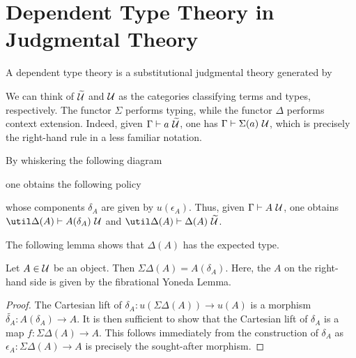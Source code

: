 \documentclass{amsart}
\begin{document}
\section{Dependent Type Theory in Judgmental Theory}
\label{sec:dependent-type-theory-in-judgmental-theory}

\begin{defn}
  A dependent type theory is a substitutional judgmental theory generated by
  
\end{defn}

We can think of $\widetilde{\mathcal{U}}$ and $\mathcal{U}$ as the categories classifying terms and types, respectively.
The functor $\Sigma$ performs typing, while the functor $\Delta$ performs context extension.
Indeed, given $\Gamma \vdash a~\widetilde{\mathcal{U}}$, one has $\Gamma \vdash \Sigma(a)~\mathcal{U}$, which is precisely the right-hand rule in a less familiar notation. 

By whiskering the following diagram

one obtains the following policy

whose components $\delta_{A}$ are given by $u(\epsilon_{A})$.
Thus, given $\Gamma \vdash A~\mathcal{U}$, one obtains $\util\Delta(A) \vdash A(\delta_{A})~\Ty$ and $\util\Delta(A) \vdash \Delta(A)~\Tm$.
The following lemma shows that $\Delta(A)$ has the expected type.

\begin{lem}
  Let $A \in \mathcal{U}$ be an object.
  Then $\Sigma\Delta(A) = A(\delta_{A})$.
  Here, the $A$ on the right-hand side is given by the fibrational Yoneda Lemma.
\end{lem}
\begin{proof}
  The Cartesian lift of $\delta_{A} : u(\Sigma\Delta(A)) \to u(A)$ is a morphism $\widetilde{\delta_{A}} : A(\delta_{A}) \to A$.
  It is then sufficient to show that the Cartesian lift of $\delta_{A}$ is a map $f : \Sigma\Delta(A) \to A$.
  This follows immediately from the construction of $\delta_{A}$ as $\epsilon_{A} : \Sigma\Delta(A) \to A$ is precisely the sought-after morphism.
\end{proof}
\end{document}
